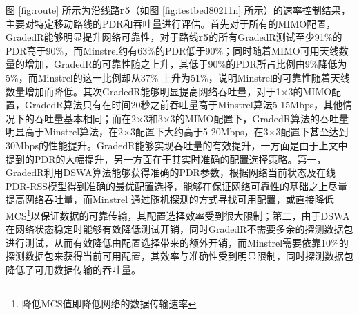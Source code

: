 \begin{figure}[!htp]
\centering
  \hspace{1in}
\centering
  \hspace{1in}
\centering
\end{figure}

图 \ref{fig:route} 所示为沿线路\textbf{r5}（如图 \ref{fig:testbed80211n} 所示）的速率控制结果，主要对特定移动路线的PDR和吞吐量进行评估。首先对于所有的MIMO配置，GradedR能够明显提升网络可靠性，对于路线\textbf{r5}的所有GradedR测试至少91\%的PDR高于90\%，而Minstrel约有63\%的PDR低于90\%；同时随着MIMO可用天线数量的增加，GradedR的可靠性随之上升，其低于90\%的PDR所占比例由9\%降低为5\%，而Minstrel的这一比例却从37\% 上升为51\%，说明Minstrel的可靠性随着天线数量增加而降低。其次GradedR能够明显提高网络吞吐量，对于1$\times$3的MIMO配置，GradedR算法只有在时间20秒之前吞吐量高于Minstrel算法5-15Mbps，其他情况下的吞吐量基本相同；而在2$\times$3和3$\times$3的MIMO配置下，GradedR算法的吞吐量明显高于Minstrel算法，在2$\times$3配置下大约高于5-20Mbps，在3$\times$3配置下甚至达到30Mbps的性能提升。GradedR能够实现吞吐量的有效提升，一方面是由于上文中提到的PDR的大幅提升，另一方面在于其实时准确的配置选择策略。第一，GradedR利用DSWA算法能够获得准确的PDR参数，根据网络当前状态及在线PDR-RSS模型得到准确的最优配置选择，能够在保证网络可靠性的基础之上尽量提高网络吞吐量，而Minstrel 通过随机探测的方式寻找可用配置，或直接降低MCS\footnote{降低MCS值即降低网络的数据传输速率}以保证数据的可靠传输，其配置选择效率受到很大限制；第二，由于DSWA在网络状态稳定时能够有效降低测试开销，同时GradedR不需要多余的探测数据包进行测试，从而有效降低由配置选择带来的额外开销，而Minstrel需要依靠10\%的探测数据包来获得当前可用配置，其效率与准确性受到明显限制，同时探测数据包降低了可用数据传输的吞吐量。

\begin{figure}[!htp]
\centering
  \hspace{1in}
\centering
  \hspace{1in}
\centering
\end{figure}

